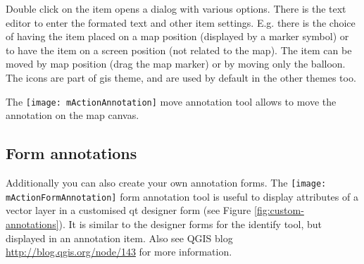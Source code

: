 Double click on the item opens a dialog with various options. There is the
text editor to enter the formated text and other item settings. E.g. there
is the choice of having the item placed on a map position (displayed by
a marker symbol) or to have the item on a screen position (not related
to the map). The item can be moved by map position (drag the map marker)
or by moving only the balloon. The icons are part of gis theme, and are used
by default in the other themes too.

The \texttt{[image: mActionAnnotation]} move annotation
tool allows to move the annotation on the map canvas.

\subsection{Form annotations}

Additionally you can also create your own annotation forms. The
\texttt{[image: mActionFormAnnotation]} form annotation
tool is useful to display attributes of a vector layer in a customised qt
designer form (see Figure \ref{fig:custom-annotations}). It is similar to the
designer forms for the identify tool, but displayed in an annotation item.
Also see QGIS blog \url{http://blog.qgis.org/node/143} for more information.

